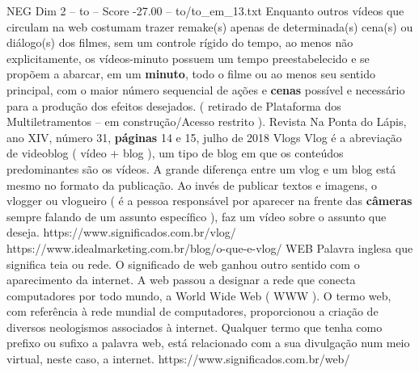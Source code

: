 \begin{textsample}{NEG Dim 2 – to – Score -27.00 – to/to\_em\_13.txt}
Enquanto outros vídeos que circulam na web costumam trazer remake(s) apenas de determinada(s) cena(s) ou diálogo(s) dos filmes, sem um controle rígido do tempo, ao menos não explicitamente, os vídeos-minuto possuem um tempo preestabelecido e se propõem a abarcar, em um \textbf{minuto}, todo o filme ou ao menos seu sentido principal, com o maior número sequencial de ações e \textbf{cenas} possível e necessário para a produção dos efeitos desejados. ( retirado de Plataforma dos Multiletramentos – em construção/Acesso restrito ).
Revista Na Ponta do Lápis, ano XIV, número 31, \textbf{páginas} 14 e 15, julho de 2018 Vlogs Vlog é a abreviação de videoblog ( vídeo + blog ), um tipo de blog em que os conteúdos predominantes são os vídeos.
A grande diferença entre um vlog e um blog está mesmo no formato da publicação.
Ao invés de publicar textos e imagens, o vlogger ou vlogueiro ( é a pessoa responsável por aparecer na frente das \textbf{câmeras} sempre falando de um assunto específico ), faz um vídeo sobre o assunto que deseja. https://www.significados.com.br/vlog/ https://www.idealmarketing.com.br/blog/o-que-e-vlog/ WEB Palavra inglesa que significa teia ou rede.
O significado de web ganhou outro sentido com o aparecimento da internet.
A web passou a designar a rede que conecta computadores por todo mundo, a World Wide Web ( WWW ).
O termo web, com referência à rede mundial de computadores, proporcionou a criação de diversos neologismos associados à internet.
Qualquer termo que tenha como prefixo ou sufixo a palavra web, está relacionado com a sua divulgação num meio virtual, neste caso, a internet. https://www.significados.com.br/web/

\end{textsample}
